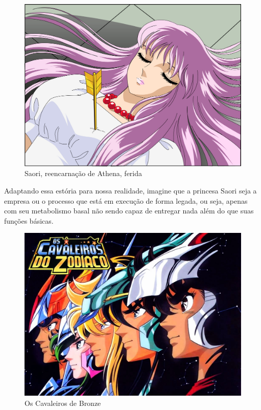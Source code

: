 \documentclass[a4paper]{article}
\begin{document}
\begin{figure}[H]
    \centering
    \includegraphics[scale=0.33,keepaspectratio=true]{images/06.png}
    \caption{Saori, reencarnação de Athena, ferida}
\end{figure}

Adaptando essa estória para nossa realidade, imagine que a princesa Saori seja a empresa ou o processo que está em execução de forma legada, ou seja, apenas com seu metabolismo basal não sendo capaz de entregar nada além do que suas funções básicas.

\begin{figure}[H]
    \centering
    \includegraphics[scale=0.33,keepaspectratio=true]{images/05.jpg}
    \caption{Os Cavaleiros de Bronze}
\end{figure}
\end{document}
